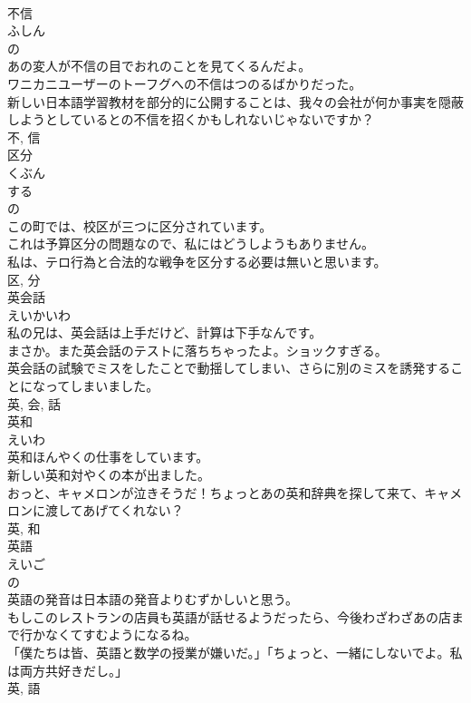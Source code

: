\documentclass[8pt]{extreport}
\begin{document}
\begin{CJK}{UTF8}{min}
\\	不信	
\\	ふしん	
\\	の 
\\	あの変人が不信の目でおれのことを見てくるんだよ。	
\\	ワニカニユーザーのトーフグへの不信はつのるばかりだった。	
\\	新しい日本語学習教材を部分的に公開することは、我々の会社が何か事実を隠蔽しようとしているとの不信を招くかもしれないじゃないですか？	
\\	不, 信	
\\	区分	
\\	くぶん	
\\	する 
\\	の 
\\	この町では、校区が三つに区分されています。	
\\	これは予算区分の問題なので、私にはどうしようもありません。	
\\	私は、テロ行為と合法的な戦争を区分する必要は無いと思います。	
\\	区, 分	
\\	英会話	
\\	えいかいわ	
\\	私の兄は、英会話は上手だけど、計算は下手なんです。	
\\	まさか。また英会話のテストに落ちちゃったよ。ショックすぎる。	
\\	英会話の試験でミスをしたことで動揺してしまい、さらに別のミスを誘発することになってしまいました。	
\\	英, 会, 話	
\\	英和	
\\	えいわ	
\\	英和ほんやくの仕事をしています。	
\\	新しい英和対やくの本が出ました。	
\\	おっと、キャメロンが泣きそうだ！ちょっとあの英和辞典を探して来て、キャメロンに渡してあげてくれない？	
\\	英, 和	
\\	英語	
\\	えいご	
\\	の 
\\	英語の発音は日本語の発音よりむずかしいと思う。	
\\	もしこのレストランの店員も英語が話せるようだったら、今後わざわざあの店まで行かなくてすむようになるね。	
\\	「僕たちは皆、英語と数学の授業が嫌いだ。」「ちょっと、一緒にしないでよ。私は両方共好きだし。」	
\\	英, 語	

\end{CJK}
\end{document}
